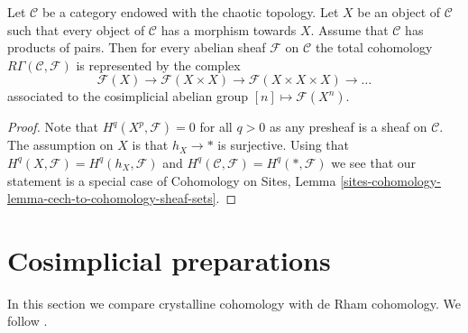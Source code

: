 \begin{lemma}
\label{lemma-category-with-covering}
Let $\mathcal{C}$ be a category endowed with the chaotic topology.
Let $X$ be an object of $\mathcal{C}$ such that every object of
$\mathcal{C}$ has a morphism towards $X$. Assume that $\mathcal{C}$
has products of pairs.
Then for every abelian sheaf $\mathcal{F}$ on $\mathcal{C}$
the total cohomology $R\Gamma(\mathcal{C}, \mathcal{F})$ is represented
by the complex
$$
\mathcal{F}(X) \to \mathcal{F}(X \times X) \to
\mathcal{F}(X \times X \times X) \to \ldots
$$
associated to the cosimplicial abelian group $[n] \mapsto \mathcal{F}(X^n)$.
\end{lemma}

\begin{proof}
Note that $H^q(X^p, \mathcal{F}) = 0$ for all $q > 0$ as any presheaf is a
sheaf on $\mathcal{C}$. The assumption on $X$ is that $h_X \to *$
is surjective. Using that $H^q(X, \mathcal{F}) = H^q(h_X, \mathcal{F})$ and
$H^q(\mathcal{C}, \mathcal{F}) = H^q(*, \mathcal{F})$ we see that our
statement is a special case of
Cohomology on Sites,
Lemma \ref{sites-cohomology-lemma-cech-to-cohomology-sheaf-sets}.
\end{proof}









\section{Cosimplicial preparations}
\label{section-cohomology}

\noindent
In this section we compare crystalline cohomology with de Rham
cohomology. We follow \cite{Bhatt}.

